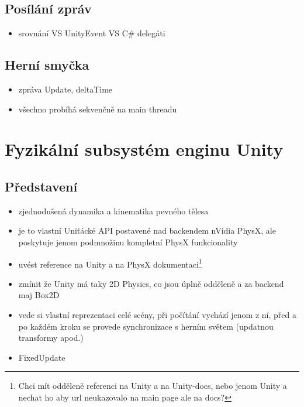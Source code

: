 \subsection{Posílání zpráv}
\begin{itemize}
    \item srovnání VS UnityEvent VS C\# delegáti 
\end{itemize}

\subsection{Herní smyčka}
\begin{itemize}
    \item zpráva Update, deltaTime
    \item všechno probíhá sekvenčně na main threadu
\end{itemize}


\section{Fyzikální subsystém enginu Unity}

\subsection{Představení}
\begin{itemize}
    \item zjednodušená dynamika a kinematika pevného tělesa
    \item je to vlastní Uniťácké API postavené nad backendem nVidia PhysX, ale poskytuje jenom podmnožinu kompletní PhysX funkcionality
    \item uvést reference na Unity a na PhysX dokumentaci\footnote{Chci mít odděleně referenci na Unity a na Unity-docs, nebo jenom Unity a nechat ho aby url neukazovalo na main page ale na docs?}
    \item zmínit že Unity má taky 2D Physics, co jsou úplně odděleně a za backend maj Box2D 
    \item vede si vlastní reprezentaci celé scény, při počítání vychází jenom z ní, před a po každém kroku se provede synchronizace s herním světem (updatnou transformy apod.)
    \item FixedUpdate
\end{itemize}


